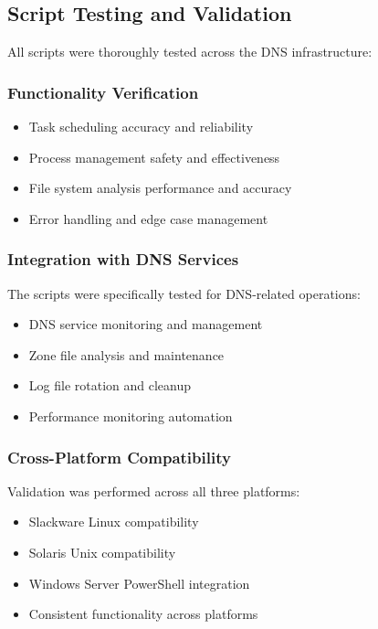 \documentclass[12pt,a4paper]{article}
\begin{document}
\subsection{Script Testing and Validation}\label{subsec:script-testing}

All scripts were thoroughly tested across the DNS infrastructure:

\subsubsection{Functionality Verification}
\begin{itemize}
    \item Task scheduling accuracy and reliability
    \item Process management safety and effectiveness  
    \item File system analysis performance and accuracy
    \item Error handling and edge case management
\end{itemize}

\subsubsection{Integration with DNS Services}
The scripts were specifically tested for DNS-related operations:
\begin{itemize}
    \item DNS service monitoring and management
    \item Zone file analysis and maintenance
    \item Log file rotation and cleanup
    \item Performance monitoring automation
\end{itemize}

\subsubsection{Cross-Platform Compatibility}
Validation was performed across all three platforms:
\begin{itemize}
    \item Slackware Linux compatibility
    \item Solaris Unix compatibility  
    \item Windows Server PowerShell integration
    \item Consistent functionality across platforms
\end{itemize}
\end{document}
